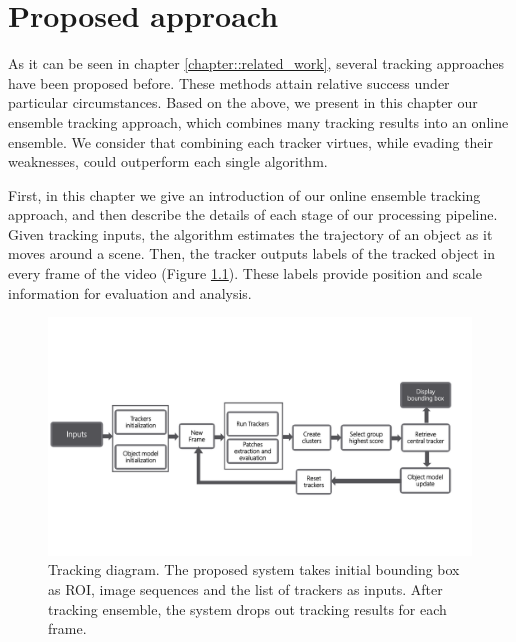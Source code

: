 \chapter{Proposed approach} %

\label{chapter::approach} %


As it can be seen in chapter \ref{chapter::related_work}, several tracking
approaches have been proposed before. These methods attain relative success under
particular circumstances. Based on the above, we present in this chapter 
our ensemble tracking approach, which combines many tracking results into an
online ensemble. We consider that combining each tracker virtues, while
evading their weaknesses, could outperform each single algorithm.

First, in this chapter we give an introduction of our online ensemble
tracking approach, and then describe the details of each stage of our
processing pipeline. Given tracking inputs, the algorithm estimates the
trajectory of an object as it moves around a scene. Then, the tracker outputs labels
of the tracked object in every frame of the video (Figure \ref{fig::global_diagram}).
These labels provide position and scale information for evaluation and analysis.

\begin{figure}[h!]
\centering
\includegraphics[page=2, width=0.8\linewidth, trim= 0cm 5.1cm 6cm 5.3cm,
                 clip=true]{Figures/global_diagram}
\caption[Tracking diagram]{\small Tracking diagram. The proposed system takes
        initial bounding box as \gls{ROI}, image sequences and the list of trackers as inputs.
        After tracking ensemble, the system drops out tracking results for each
        frame.}
\label{fig::global_diagram}
\end{figure}


